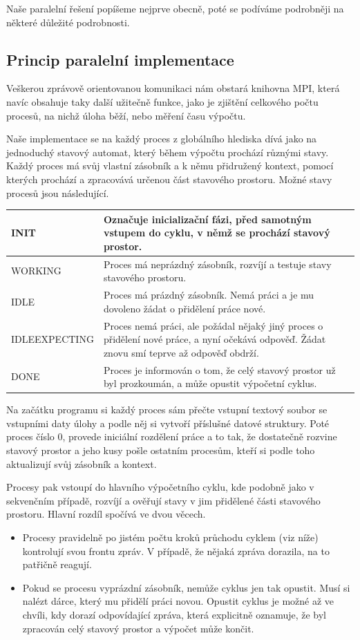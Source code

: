 \documentclass[12pt]{article}
\theoremstyle{definition}
\begin{document}
Naše paralelní řešení popíšeme nejprve obecně, poté se podíváme podrobněji na některé důležité podrobnosti.
\subsection{Princip paralelní implementace}
Veškerou zprávově orientovanou komunikaci nám obstará knihovna MPI, která navíc obsahuje
taky další užitečně funkce, jako je zjištění celkového počtu procesů, na nichž úloha běží, nebo měření času výpočtu.

Naše implementace se na každý proces z globálního hlediska dívá jako na jednoduchý stavový automat, který
během výpočtu prochází různými stavy. Každý proces má svůj vlastní zásobník a k němu přidružený kontext,
pomocí kterých prochází a zpracovává určenou část stavového prostoru. Možné stavy procesů jsou následující.
\newline
\begin{center}
	\begin{tabular}{p{4cm}|p{8cm}}
		INIT & Označuje inicializační fázi, před samotným vstupem do cyklu, v němž se prochází stavový prostor.\\
		\hline
		WORKING & Proces má neprázdný zásobník, rozvíjí a testuje stavy stavového prostoru.\\
		\hline
		IDLE & Proces má prázdný zásobník. Nemá práci a je mu dovoleno žádat o přidělení práce nové.\\
		\hline
		IDLE\textunderscore EXPECTING & Proces nemá práci, ale požádal nějaký jiný proces o přidělení nové práce, a nyní
		očekává odpověď. Žádat znovu smí teprve až odpověď obdrží.\\
		\hline
		DONE & Proces je informován o tom, že celý stavový prostor už byl prozkoumán, a může opustit výpočetní cyklus.\\
	\end{tabular}
	\newline
\end{center}


Na začátku programu si každý proces sám přečte vstupní textový soubor se vstupními daty úlohy
a podle něj si vytvoří příslušné datové struktury. Poté proces číslo $0$, provede
iniciální rozdělení práce a to tak, že dostatečně rozvine stavový prostor a jeho kusy pošle ostatním procesům,
kteří si podle toho aktualizují svůj zásobník a kontext.

Procesy pak vstoupí do hlavního výpočetního cyklu, kde podobně jako v sekvenčním případě, rozvíjí a ověřují
stavy v jim přidělené části stavového prostoru. Hlavní rozdíl spočívá ve dvou věcech.
\begin{itemize}
	\item Procesy pravidelně po jistém počtu kroků průchodu cyklem (viz níže) kontrolují svou frontu zpráv. V případě,
	že nějaká zpráva dorazila, na to patřičně reagují.
	\item Pokud se procesu vyprázdní zásobník, nemůže cyklus jen tak opustit. Musí si nalézt dárce, který
	mu přidělí práci novou. Opustit cyklus je možné až ve chvíli, kdy dorazí odpovídající zpráva, která explicitně
	oznamuje, že byl zpracován celý stavový prostor a výpočet může končit.
\end{itemize}
\end{document}
